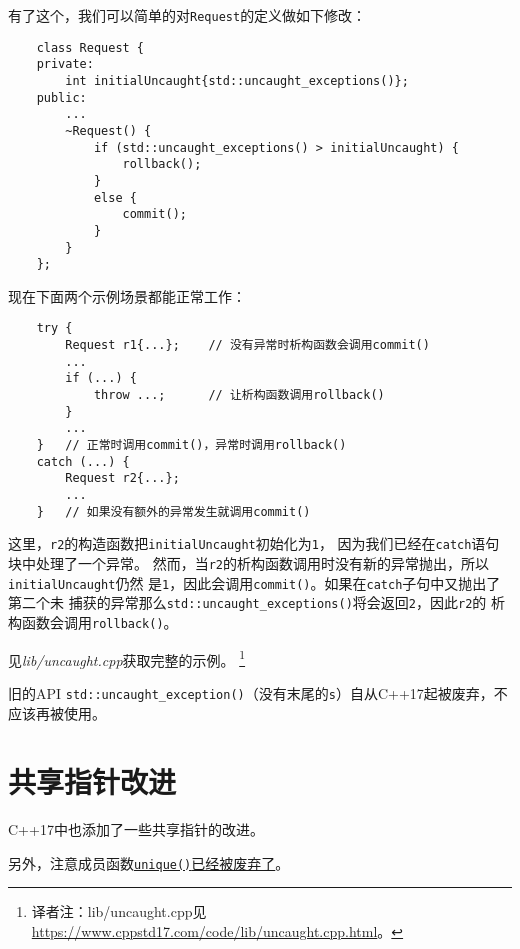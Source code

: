 有了这个，我们可以简单的对\texttt{Request}的定义做如下修改：
\begin{lstlisting}
    class Request {
    private:
        int initialUncaught{std::uncaught_exceptions()};
    public:
        ...
        ~Request() {
            if (std::uncaught_exceptions() > initialUncaught) {
                rollback();
            }
            else {
                commit();
            }
        }
    };
\end{lstlisting}
现在下面两个示例场景都能正常工作：
\begin{lstlisting}
    try {
        Request r1{...};    // 没有异常时析构函数会调用commit()
        ...
        if (...) {
            throw ...;      // 让析构函数调用rollback()
        }
        ...
    }   // 正常时调用commit()，异常时调用rollback()
    catch (...) {
        Request r2{...};
        ...
    }   // 如果没有额外的异常发生就调用commit()
\end{lstlisting}
这里，\texttt{r2}的构造函数把\texttt{initialUncaught}初始化为\texttt{1}，
因为我们已经在\texttt{catch}语句块中处理了一个异常。
然而，当\texttt{r2}的析构函数调用时没有新的异常抛出，所以\texttt{initialUncaught}仍然
是\texttt{1}，因此会调用\texttt{commit()}。如果在\texttt{catch}子句中又抛出了第二个未
捕获的异常那么\texttt{std::uncaught\_exceptions()}将会返回\texttt{2}，因此\texttt{r2}的
析构函数会调用\texttt{rollback()}。

见\emph{lib/uncaught.cpp}获取完整的示例。
\footnote{译者注：lib/uncaught.cpp见\url{https://www.cppstd17.com/code/lib/uncaught.cpp.html}。}

旧的API \texttt{std::uncaught\_exception()}（没有末尾的\texttt{s}）自从C++17起被废弃，不应该再被使用。


\section{共享指针改进}
C++17中也添加了一些共享指针的改进。

另外，注意成员函数\hyperref[ch35.2.7]{\texttt{unique()}已经被废弃了}。

